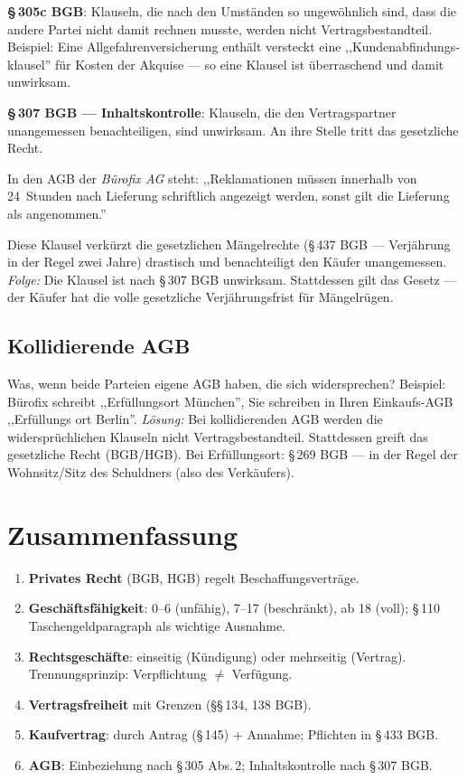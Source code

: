 \documentclass[11pt, a4paper]{article}
\begin{document}
\textbf{§\,305c BGB}: Klauseln, die nach den Umständen so ungewöhnlich sind, dass die
andere Partei nicht damit rechnen musste, werden nicht Vertragsbestandteil. Beispiel:
Eine Allgefahren­versicherung enthält versteckt eine ,,Kunden­abfindungs­klausel'' für
Kosten der Akquise --- so eine Klausel ist überraschend und damit unwirksam.

\textbf{§\,307 BGB --- Inhaltskontrolle}: Klauseln, die den Vertragspartner unangemessen
benachteiligen, sind unwirksam. An ihre Stelle tritt das gesetzliche Recht.

\begin{beispiel}
In den AGB der \emph{Bürofix AG} steht: ,,Reklamationen müssen innerhalb von 24~Stunden
nach Lieferung schriftlich angezeigt werden, sonst gilt die Lieferung als angenommen.''

Diese Klausel verkürzt die gesetzlichen Mängelrechte (§\,437 BGB --- Verjährung in der
Regel zwei Jahre) drastisch und benachteiligt den Käufer unangemessen. \emph{Folge:}
Die Klausel ist nach §\,307 BGB unwirksam. Stattdessen gilt das Gesetz --- der Käufer
hat die volle gesetzliche Verjährungsfrist für Mängelrügen.
\end{beispiel}

\subsection{Kollidierende AGB}

Was, wenn beide Parteien eigene AGB haben, die sich widersprechen? Beispiel: Bürofix
schreibt ,,Erfüllungsort München'', Sie schreiben in Ihren Einkaufs-AGB ,,Erfüllungs­
ort Berlin''. \emph{Lösung:} Bei kollidierenden AGB werden die widersprüchlichen
Klauseln nicht Vertragsbestandteil. Stattdessen greift das gesetzliche Recht
(BGB/HGB). Bei Erfüllungsort: §\,269 BGB --- in der Regel der Wohnsitz/Sitz des
Schuldners (also des Verkäufers).

\section{Zusammenfassung}

\begin{enumerate}
  \item \textbf{Privates Recht} (BGB, HGB) regelt Beschaffungsverträge.
  \item \textbf{Geschäftsfähigkeit}: 0--6 (unfähig), 7--17 (beschränkt), ab 18 (voll); §\,110 Taschengeld\-paragraph als wichtige Ausnahme.
  \item \textbf{Rechtsgeschäfte}: einseitig (Kündigung) oder mehrseitig (Vertrag). Trennungsprinzip: Verpflichtung $\neq$ Verfügung.
  \item \textbf{Vertragsfreiheit} mit Grenzen (§§\,134, 138 BGB).
  \item \textbf{Kaufvertrag}: durch Antrag (§\,145) + Annahme; Pflichten in §\,433 BGB.
  \item \textbf{AGB}: Einbeziehung nach §\,305 Abs.\,2; Inhaltskontrolle nach §\,307 BGB.
\end{enumerate}
\end{document}
